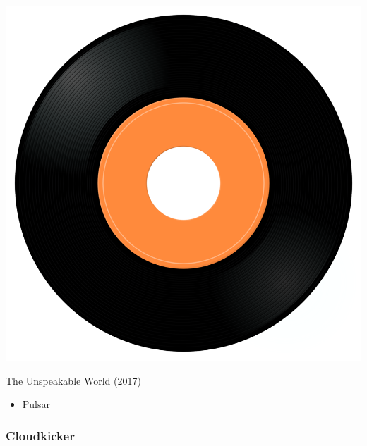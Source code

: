 \begin{minipage}[t]{0.25\textwidth}
\captionsetup{type=figure}
\includegraphics[width=\textwidth]{Images/cover.png}
\caption*{The Unspeakable World (2017)}
\end{minipage}
\begin{minipage}[t]{0.25\textwidth}\vspace{0pt}
\begin{itemize}[nosep,leftmargin=1em,labelwidth=*,align=left]
	\setlength{\itemsep}{0pt}
	\item Pulsar
\end{itemize}
\end{minipage}

\subsubsection{Cloudkicker}

